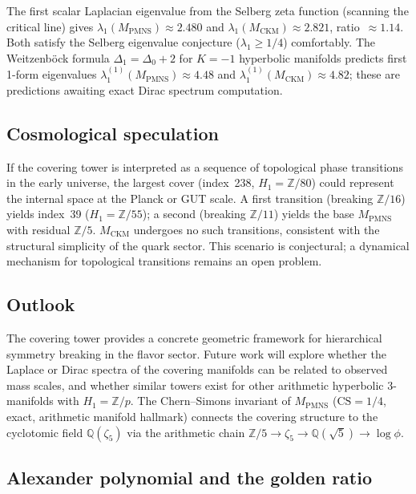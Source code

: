 ﻿\documentclass[12pt]{article}
\theoremstyle{definition}
\begin{document}
The first scalar Laplacian eigenvalue from the Selberg zeta function
(scanning the critical line) gives $\lambda_1(M_\text{PMNS})\approx 2.480$
and $\lambda_1(M_\text{CKM})\approx 2.821$, ratio~$\approx 1.14$.
Both satisfy the Selberg eigenvalue conjecture ($\lambda_1\geq 1/4$)
comfortably. The Weitzenb\"{o}ck formula $\Delta_1=\Delta_0+2$ for
$K=-1$ hyperbolic manifolds predicts first 1-form eigenvalues
$\lambda_1^{(1)}(M_\text{PMNS})\approx 4.48$ and
$\lambda_1^{(1)}(M_\text{CKM})\approx 4.82$; these are predictions
awaiting exact Dirac spectrum computation.

\subsection{Cosmological speculation}
\label{subsec:cosm_covering}

If the covering tower is interpreted as a sequence of topological
phase transitions in the early universe, the largest cover (index~238,
$H_1=\mathbb{Z}/80$) could represent the internal space at the Planck
or GUT scale. A first transition (breaking $\mathbb{Z}/16$) yields
index~39 ($H_1=\mathbb{Z}/55$); a second (breaking $\mathbb{Z}/11$)
yields the base $M_\text{PMNS}$ with residual $\mathbb{Z}/5$.
$M_\text{CKM}$ undergoes no such transitions, consistent with the
structural simplicity of the quark sector. This scenario is
conjectural; a dynamical mechanism for topological transitions
remains an open problem.

\subsection{Outlook}

The covering tower provides a concrete geometric framework for
hierarchical symmetry breaking in the flavor sector. Future work
will explore whether the Laplace or Dirac spectra of the covering
manifolds can be related to observed mass scales, and whether
similar towers exist for other arithmetic hyperbolic 3-manifolds
with $H_1=\mathbb{Z}/p$. The Chern--Simons invariant of $M_\text{PMNS}$
($\mathrm{CS}=1/4$, exact, arithmetic manifold hallmark) connects
the covering structure to the cyclotomic field
$\mathbb{Q}(\zeta_5)$ via the arithmetic chain
$\mathbb{Z}/5\to\zeta_5\to\mathbb{Q}(\sqrt{5})\to\log\phi$.


\subsection{Alexander polynomial and the golden ratio}
\label{subsec:alexander}
\end{document}
